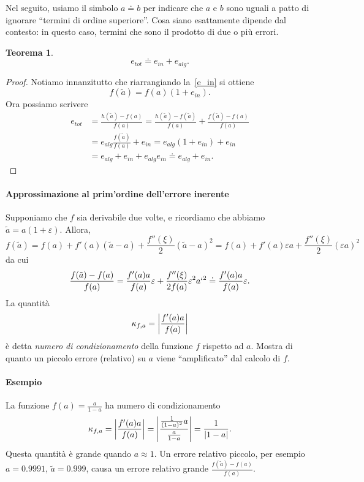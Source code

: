 \documentclass[a4paper]{report}
\DeclarePairedDelimiter{\abs}{\lvert}{\rvert}
\newtheorem{theorem}{Teorema}[chapter]
\theoremstyle{definiton}
\theoremstyle{remark}
\begin{document}
Nel seguito, usiamo il simbolo $a \doteq b$ per indicare che $a$ e $b$ sono uguali a patto di ignorare ``termini di ordine superiore''. Cosa siano esattamente dipende dal contesto: in questo caso, termini che sono il prodotto di due o più errori.

\begin{theorem}
\[
e_{tot} \doteq e_{in} + e_{alg}.
\]
\end{theorem}
\begin{proof} Notiamo innanzitutto che riarrangiando la~\eqref{e_in} si ottiene
\[
f(\tilde{a}) = f(a)(1+e_{in}).
\]
Ora possiamo scrivere
\begin{align*}
e_{tot} &= \frac{h(\tilde{a}) - f(a)}{f(a)} = \frac{h(\tilde{a}) - f(\tilde{a})}{f(a)} + \frac{f(\tilde{a}) - f(a)}{f(a)}\\
&= e_{alg}\frac{f(\tilde{a})}{f(a)} + e_{in} = e_{alg}(1+e_{in}) + e_{in}\\
&= e_{alg} + e_{in} + e_{alg}e_{in} \doteq e_{alg} + e_{in}.
\end{align*}
\end{proof}

\paragraph{Approssimazione al prim'ordine dell'errore inerente}
Supponiamo che $f$ sia derivabile due volte, e ricordiamo che abbiamo $\tilde{a} = a(1+\varepsilon)$.
Allora,
\[
f(\tilde{a}) = f(a) + f'(a)(\tilde{a} - a) + \frac{f''(\xi)}{2}(\tilde{a}-a)^2 = f(a) + f'(a)\varepsilon a + \frac{f''(\xi)}{2}(\varepsilon a)^2
\]
da cui
\[
\frac{f(\tilde{a}) - f(a)}{f(a)} = \frac{f'(a)a}{f(a)}\varepsilon + \frac{f''(\xi)}{2f(a)}\varepsilon^2 a`^2 \doteq \frac{f'(a)a}{f(a)}\varepsilon.
\]
La quantità
\[
\kappa_{f,a} = \abs*{\frac{f'(a)a}{f(a)}}
\]
è detta \emph{numero di condizionamento} della funzione $f$ rispetto ad $a$. Mostra di quanto un piccolo errore (relativo) su $a$ viene ``amplificato'' dal calcolo di $f$.

\paragraph{Esempio} La funzione $f(a) = \frac{a}{1-a}$ ha numero di condizionamento
\[
\kappa_{f,a} = \abs*{\frac{f'(a)a}{f(a)}} = \abs*{\frac{\frac{1}{(1-a)^2}a}{\frac{a}{1-a}}} = \frac{1}{\abs{1-a}}.
\]
Questa quantità è grande quando $a\approx 1$. Un errore relativo piccolo, per esempio $a=0.9991$, $\tilde{a} = 0.999$, causa un errore relativo grande $\frac{f(\tilde{a})-f(a)}{f(a)}$.
\end{document}
